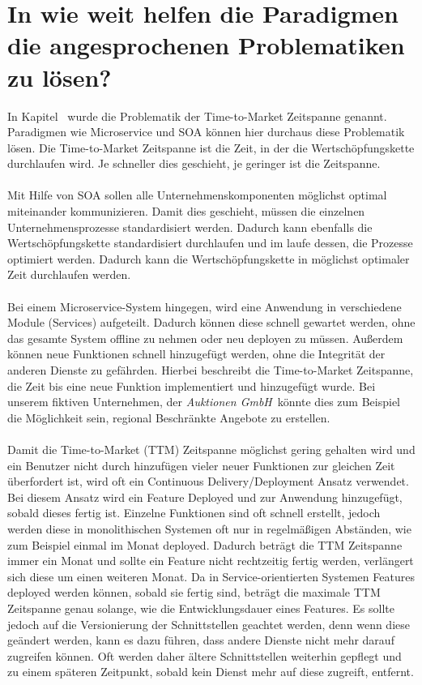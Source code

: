 \section{In wie weit helfen die Paradigmen die angesprochenen Problematiken zu lösen?}
\label{sec:LoesungDerProblematiken}
In Kapitel \ wurde die Problematik der Time-to-Market Zeitspanne genannt. Paradigmen wie Microservice und SOA können hier durchaus diese Problematik lösen. Die Time-to-Market Zeitspanne ist die Zeit, in der die Wertschöpfungskette durchlaufen wird. Je schneller dies geschieht, je geringer ist die Zeitspanne.
\\\\
Mit Hilfe von SOA sollen alle Unternehmenskomponenten möglichst optimal miteinander kommunizieren. Damit dies geschieht, müssen die einzelnen Unternehmensprozesse standardisiert werden. Dadurch kann ebenfalls die Wertschöpfungskette standardisiert durchlaufen und im laufe dessen, die Prozesse optimiert werden. Dadurch kann die Wertschöpfungskette in möglichst optimaler Zeit durchlaufen werden.
\\\\
Bei einem Microservice-System hingegen, wird eine Anwendung in verschiedene Module (Services) aufgeteilt. Dadurch können diese schnell gewartet werden, ohne das gesamte System offline zu nehmen oder neu deployen zu müssen. Außerdem können neue Funktionen schnell hinzugefügt werden, ohne die Integrität der anderen Dienste zu gefährden. Hierbei beschreibt die Time-to-Market Zeitspanne, die Zeit bis eine neue Funktion implementiert und hinzugefügt wurde. Bei unserem fiktiven Unternehmen, der \textit{Auktionen GmbH}\ könnte dies zum Beispiel die Möglichkeit sein, regional Beschränkte Angebote zu erstellen.
\\\\
Damit die Time-to-Market (TTM) Zeitspanne möglichst gering gehalten wird und ein Benutzer nicht durch hinzufügen vieler neuer Funktionen zur gleichen Zeit überfordert ist, wird oft ein Continuous Delivery/Deployment Ansatz verwendet. Bei diesem Ansatz wird ein Feature Deployed und zur Anwendung hinzugefügt, sobald dieses fertig ist. Einzelne Funktionen sind oft schnell erstellt, jedoch werden diese in monolithischen Systemen oft nur in regelmäßigen Abständen, wie zum Beispiel einmal im Monat deployed. Dadurch beträgt die TTM Zeitspanne immer ein Monat und sollte ein Feature nicht rechtzeitig fertig werden, verlängert sich diese um einen weiteren Monat. Da in Service-orientierten Systemen Features deployed werden können, sobald sie fertig sind, beträgt die maximale TTM Zeitspanne genau solange, wie die Entwicklungsdauer eines Features. Es sollte jedoch auf die Versionierung der Schnittstellen geachtet werden, denn wenn diese geändert werden, kann es dazu führen, dass andere Dienste nicht mehr darauf zugreifen können. Oft werden daher ältere Schnittstellen weiterhin gepflegt und zu einem späteren Zeitpunkt, sobald kein Dienst mehr auf diese zugreift, entfernt.

